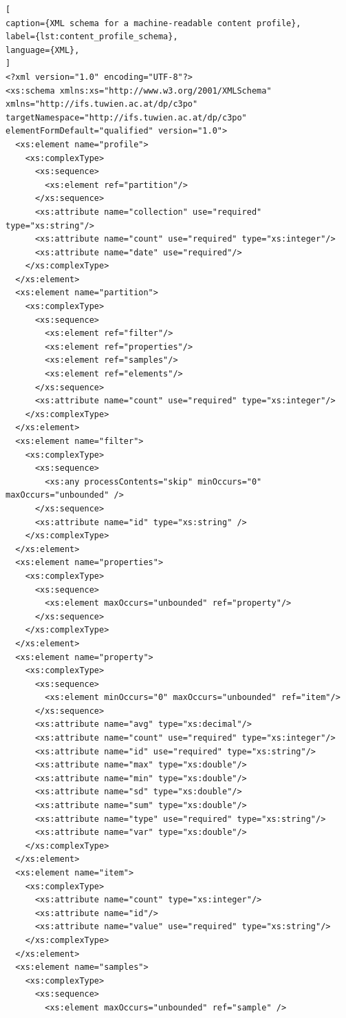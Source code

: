 \begin{lstlisting}[
caption={XML schema for a machine-readable content profile},
label={lst:content_profile_schema},
language={XML},
]
<?xml version="1.0" encoding="UTF-8"?>
<xs:schema xmlns:xs="http://www.w3.org/2001/XMLSchema" xmlns="http://ifs.tuwien.ac.at/dp/c3po" targetNamespace="http://ifs.tuwien.ac.at/dp/c3po" elementFormDefault="qualified" version="1.0">
  <xs:element name="profile">
    <xs:complexType>
      <xs:sequence>
        <xs:element ref="partition"/>
      </xs:sequence>
      <xs:attribute name="collection" use="required" type="xs:string"/>
      <xs:attribute name="count" use="required" type="xs:integer"/>
      <xs:attribute name="date" use="required"/>
    </xs:complexType>
  </xs:element>
  <xs:element name="partition">
    <xs:complexType>
      <xs:sequence>
        <xs:element ref="filter"/>
        <xs:element ref="properties"/>
        <xs:element ref="samples"/>
        <xs:element ref="elements"/>
      </xs:sequence>
      <xs:attribute name="count" use="required" type="xs:integer"/>
    </xs:complexType>
  </xs:element>
  <xs:element name="filter">
    <xs:complexType>
      <xs:sequence>
        <xs:any processContents="skip" minOccurs="0" maxOccurs="unbounded" />
      </xs:sequence>
      <xs:attribute name="id" type="xs:string" />
    </xs:complexType>
  </xs:element>
  <xs:element name="properties">
    <xs:complexType>
      <xs:sequence>
        <xs:element maxOccurs="unbounded" ref="property"/>
      </xs:sequence>
    </xs:complexType>
  </xs:element>
  <xs:element name="property">
    <xs:complexType>
      <xs:sequence>
        <xs:element minOccurs="0" maxOccurs="unbounded" ref="item"/>
      </xs:sequence>
      <xs:attribute name="avg" type="xs:decimal"/>
      <xs:attribute name="count" use="required" type="xs:integer"/>
      <xs:attribute name="id" use="required" type="xs:string"/>
      <xs:attribute name="max" type="xs:double"/>
      <xs:attribute name="min" type="xs:double"/>
      <xs:attribute name="sd" type="xs:double"/>
      <xs:attribute name="sum" type="xs:double"/>
      <xs:attribute name="type" use="required" type="xs:string"/>
      <xs:attribute name="var" type="xs:double"/>
    </xs:complexType>
  </xs:element>
  <xs:element name="item">
    <xs:complexType>
      <xs:attribute name="count" type="xs:integer"/>
      <xs:attribute name="id"/>
      <xs:attribute name="value" use="required" type="xs:string"/>
    </xs:complexType>
  </xs:element>
  <xs:element name="samples">
    <xs:complexType>
      <xs:sequence>
        <xs:element maxOccurs="unbounded" ref="sample" />

\end{lstlisting}
